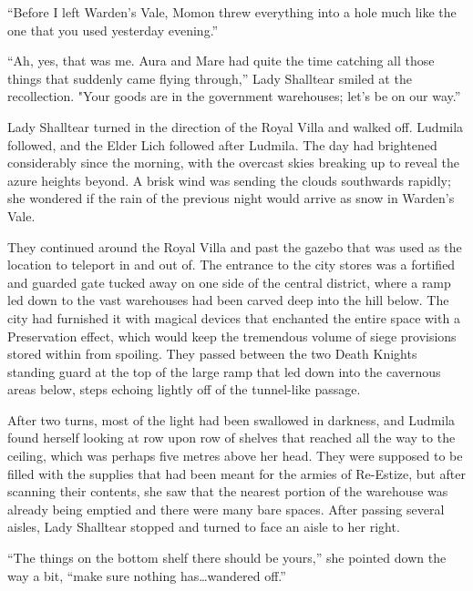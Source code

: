 “Before I left Warden’s Vale, Momon threw everything into a hole much like the one that you used yesterday evening.”

 

“Ah, yes, that was me. Aura and Mare had quite the time catching all those things that suddenly came flying through,” Lady Shalltear smiled at the recollection. "Your goods are in the government warehouses; let’s be on our way.”

 

Lady Shalltear turned in the direction of the Royal Villa and walked off. Ludmila followed, and the Elder Lich followed after Ludmila. The day had brightened considerably since the morning, with the overcast skies breaking up to reveal the azure heights beyond. A brisk wind was sending the clouds southwards rapidly; she wondered if the rain of the previous night would arrive as snow in Warden’s Vale.

 

They continued around the Royal Villa and past the gazebo that was used as the location to teleport in and out of. The entrance to the city stores was a fortified and guarded gate tucked away on one side of the central district, where a ramp led down to the vast warehouses had been carved deep into the hill below. The city had furnished it with magical devices that enchanted the entire space with a Preservation effect, which would keep the tremendous volume of siege provisions stored within from spoiling. They passed between the two Death Knights standing guard at the top of the large ramp that led down into the cavernous areas below, steps echoing lightly off of the tunnel-like passage.

 

After two turns, most of the light had been swallowed in darkness, and Ludmila found herself looking at row upon row of shelves that reached all the way to the ceiling, which was perhaps five metres above her head. They were supposed to be filled with the supplies that had been meant for the armies of Re-Estize, but after scanning their contents, she saw that the nearest portion of the warehouse was already being emptied and there were many bare spaces. After passing several aisles, Lady Shalltear stopped and turned to face an aisle to her right.

 

“The things on the bottom shelf there should be yours,” she pointed down the way a bit, “make sure nothing has…wandered off.”

 

